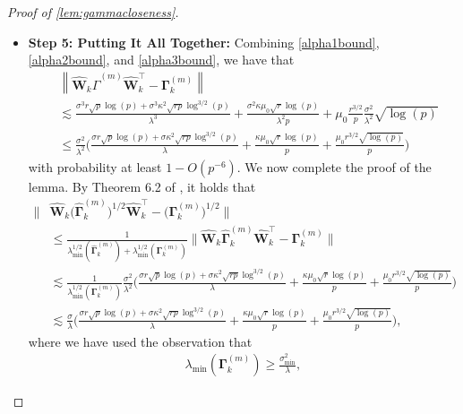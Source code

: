 \documentclass[10pt]{article}
\newcommand{\0}{{\mathbf{0}}}
\newcommand{\1}{{\mathbf{1}}}
\renewcommand{\citet}{\cite}
\renewcommand{\t}{^{\top}}
\renewcommand{\hat}{\widehat}
\renewcommand{\hat}{\widehat}
\begin{document}
\begin{proof}[Proof of \cref{lem:gammacloseness}]
\begin{itemize}
\begin{align}
    \alpha_3 &\lesssim \mu_0 \frac{r^{3/2}}{p} \frac{\sigma^2}{\lambda^2} \sqrt{\log(p)}. \label{alpha3bound}
\end{align}
\item \textbf{Step 5: Putting It All Together:} Combining \eqref{alpha1bound}, \eqref{alpha2bound}, and \eqref{alpha3bound}, we have that
\begin{align*}
   & \left\|\hat{\mathbf{W}}_{k} \hat{\Gamma}^{(m)} \hat{\mathbf{W}}_{k}^{\top}-\mathbf{\Gamma}^{(m)}_k\right\| \\&\lesssim \frac{\sigma^{3} r \sqrt{p} \log (p)+\sigma^{3} \kappa^{2} \sqrt{r p} \log ^{3 / 2}(p)}{\lambda^{3}} +\frac{\sigma^{2} \kappa \mu_{0} \sqrt{r} \log (p)}{\lambda^{2} p} +  \mu_0 \frac{r^{3/2}}{p} \frac{\sigma^2}{\lambda^2} \sqrt{\log(p)} \\
    &\leq \frac{\sigma^2}{\lambda^2} \bigg( \frac{\sigma r \sqrt{p}\log(p) + \sigma \kappa^2 \sqrt{rp} \log^{3/2}(p)}{\lambda} + \frac{\kappa \mu_0 \sqrt{r} \log(p)}{p} + \frac{\mu_0 r^{3/2} \sqrt{\log(p)}}{p} \bigg)
\end{align*}
with probability at least $1 - O(p^{-6})$. We now complete the proof of the lemma.  By Theorem 6.2 of \citet{higham_functions_2008}, it holds that
\begin{align*}
    \| &\mathbf{\hat W}_k\big(\mathbf{\hat \Gamma}^{(m)}_k \big)^{1/2}\mathbf{\hat W}_k\t -\big(\mathbf{\Gamma}^{(m)}_k \big)^{1/2} \| \\
    &\leq \frac{1}{ \lambda_{\min}^{1/2}(\mathbf{\hat \Gamma}^{(m)}_k) + \lambda_{\min}^{1/2}( \mathbf{\Gamma}^{(m)}_k)} \| \mathbf{\hat W}_k \mathbf{\hat \Gamma}^{(m)}_k \mathbf{\hat W}_k\t - \mathbf{\Gamma}^{(m)}_k \| \\
    &\lesssim \frac{1}{\lambda_{\min}^{1/2}( \mathbf{\Gamma}^{(m)}_k)}  \frac{\sigma^2}{\lambda^2} \bigg( \frac{\sigma r \sqrt{p}\log(p) + \sigma \kappa^2 \sqrt{rp} \log^{3/2}(p)}{\lambda} + \frac{\kappa \mu_0 \sqrt{r} \log(p)}{p} + \frac{\mu_0 r^{3/2} \sqrt{\log(p)}}{p} \bigg) \\
    &\lesssim \frac{\sigma}{\lambda} \bigg( \frac{\sigma r \sqrt{p}\log(p) + \sigma \kappa^2 \sqrt{rp} \log^{3/2}(p)}{\lambda} + \frac{\kappa \mu_0 \sqrt{r} \log(p)}{p} + \frac{\mu_0 r^{3/2} \sqrt{\log(p)}}{p} \bigg),
\end{align*}
where we have used the observation that
\begin{align*}
     \lambda_{\min}( \mathbf{\Gamma}^{(m)}_k ) \geq \frac{\sigma_{\min}^2}{\lambda},
 \end{align*}

\end{itemize}
\end{proof}
\end{document}
